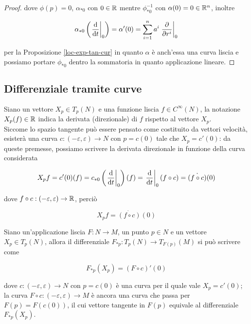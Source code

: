 \begin{proof}
	dove $ \phi(p) = 0 $, $ \alpha_{*0} $ con $ 0 \in \mathbb{R} $ mentre $ \phi^{-1}_{*0} $ con $ \alpha(0) = 0 \in \mathbb{R}^{n} $, inoltre
	
	\begin{equation}
		\alpha_{*0} \left( \eval{ \dv{t} }_{0} \right) = \alpha'(0) %
		= \sum_{i=1}^{n} a^{i} \eval{ \pdv{r^{i}} }_{0}
	\end{equation}

	per la Proposizione \ref{loc-exp-tan-cur} in quanto $ \alpha $ è anch'essa una curva liscia e possiamo portare $ \phi_{*0} $ dentro la sommatoria in quanto applicazione lineare.
\end{proof}

\subsection{Differenziale tramite curve}

Siano un vettore $ X_{p} \in T_{p}(N) $ e una funzione liscia $ f \in C^{\infty}(N) $, la notazione $ X_{p}(f) \in \mathbb{R} $ indica la derivata (direzionale) di $ f $ rispetto al vettore $ X_{p} $.\\
Siccome lo spazio tangente può essere pensato come costituito da vettori velocità, esisterà una curva $ c : (-\varepsilon,\varepsilon) \to N $ con $ p = c(0) $ tale che $ X_{p} = c'(0) $: da queste premesse, possiamo scrivere la derivata direzionale in funzione della curva considerata

\begin{equation}
	X_{p} f = c'(0) (f) %
	= c_{*0} \left( \eval{ \dv{t} }_{0} \right) (f) %
	= \eval{ \dv{t} }_{0} (f \circ c) %
	= \dot{(f \circ c)}(0)
\end{equation}

dove $ f \circ c : (-\varepsilon,\varepsilon) \to \mathbb{R} $, perciò

\begin{equation}
	X_{p} f = \dot{(f \circ c)}(0)
\end{equation}

\begin{definition}
	Siano un'applicazione liscia $ F : N \to M $, un punto $ p \in N $ e un vettore $ X_{p} \in T_{p}(N) $, allora il differenziale $ F_{*p} : T_{p}(N) \to T_{F(p)}(M) $ si può scrivere come
	
	\begin{equation}
		F_{*p}(X_{p}) = (F \circ c)' (0)
	\end{equation}

	dove $ c : (-\varepsilon,\varepsilon) \to N $ con $ p = c(0) $ è una curva per il quale vale $ X_{p} = c'(0) $; la curva $ F \circ c : (-\varepsilon,\varepsilon) \to M $ è ancora una curva che passa per $ F(p) = F(c(0)) $, il cui vettore tangente in $ F(p) $ equivale al differenziale $ F_{*p}(X_{p}) $.
	
\end{definition}

